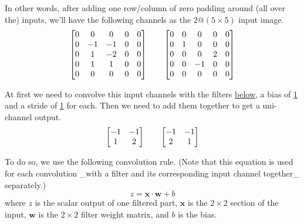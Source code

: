 \documentclass[conference]{IEEEtran}
\begin{document}
In other words, after adding one row/column of zero padding around (all over the) inputs, we'll have the following channels as the $2@(5\times5)$ input image.
\begin{align}
    \begin{bmatrix}
        0 & 0  & 0  & 0 & 0 \\
        0 & -1 & -1 & 0 & 0 \\
        0 & 1  & -2 & 0 & 0 \\
        0 & 1  & 1  & 0 & 0 \\
        0 & 0  & 0  & 0 & 0
    \end{bmatrix} \hspace{20px} \begin{bmatrix}
                                    0 & 0 & 0  & 0 & 0 \\
                                    0 & 1 & 0  & 0 & 0 \\
                                    0 & 0 & 0  & 2 & 0 \\
                                    0 & 0 & -1 & 0 & 0 \\
                                    0 & 0 & 0  & 0 & 0
                                \end{bmatrix}
\end{align}

At first we need to convolve this input channels with the filters \underline{below}, a bias of \underline{1} and a stride of \underline{1} for each. Then we need to add them together to get a uni-channel output.
\begin{align}
    \begin{bmatrix}
        -1 & -1 \\
        1  & 2
    \end{bmatrix} \hspace{20px} \begin{bmatrix}
                                    -1 & -1 \\
                                    2  & 1
                                \end{bmatrix}
\end{align}

To do so, we use the following convolution rule. (Note that this equation is used for each convolution \_with a filter and its corresponding input channel together\_ separately.)
\begin{equation}
    z = \mathbf{x} \cdot \mathbf{w} + b
\end{equation}
where $z$ is the scalar output of one filtered part, $\mathbf{x}$ is the $2\times2$ section of the input, $\mathbf{w}$ is the $2\times2$ filter weight matrix, and $b$ is the bias.
\end{document}
